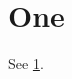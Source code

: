 \documentclass{article}
\begin{document}
\section{One}\label{sec:a}
See \ref{sec:a}.
\end{document}
